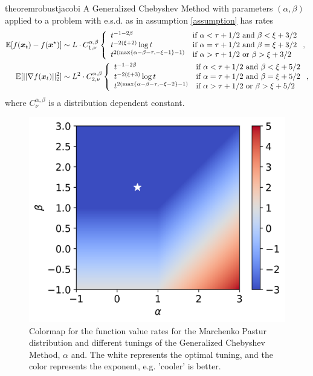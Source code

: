 \documentclass{article}
\begin{document}
\begin{restatable}{theorem}{robustjacobi}\label{thm: jacobirates}
A Generalized Chebyshev Method with parameters $(\alpha,\beta)$ applied to a problem with e.s.d. as in assumption \ref{assumption} has rates
\begin{align}
\mathbb{E}[f({\boldsymbol x}_t)-f({\boldsymbol x}^\star)]&\sim L\cdot C^{\alpha,\beta}_{1,\nu}
    \left\{\begin{array}{ll}
    t^{-1-2\beta} &\mbox{if } 
		  \alpha<\tau+1/2 \text{ and } \beta <\xi+3/2\\
		  t^{-2(\xi+2)}\log t& \mbox{if } 
		  \alpha=\tau+1/2 \text{ and } \beta =\xi+3/2\\
		  t^{2(\max\{\alpha-\beta-\tau,-\xi-1\}-1)}& \mbox{if } 
		  \alpha>\tau+1/2 \text{ or } \beta >\xi+3/2
	\end{array}\right. ,\\
	\mathbb{E}[||\nabla f({\boldsymbol x}_t)||^2_2]&\sim L^2\cdot C^{\alpha,\beta}_{2,\nu}
        \left\{\begin{array}{ll}
    t^{-1-2\beta} &\mbox{if } 
		  \alpha<\tau+1/2 \text{ and } \beta <\xi+5/2\\
		  t^{-2(\xi+3)}\log t& \mbox{if } 
		  \alpha=\tau+1/2 \text{ and } \beta =\xi+5/2\\
		  t^{2(\max\{\alpha-\beta-\tau,-\xi-2\}-1)}& \mbox{if } 
		  \alpha>\tau+1/2 \text{ or } \beta >\xi+5/2
	\end{array}\right. ,
\end{align}
where $C^{\alpha,\beta}_\nu$ is a distribution dependent constant.
\end{restatable}
\begin{figure}
    \centering
    \includegraphics[width=4 cm]{new_imgs/cmap.png}
    
    \caption{Colormap for the function value rates  for the Marchenko Pastur distribution and different tunings of the Generalized Chebyshev Method, $\alpha$ and. The white represents the optimal tuning, and the color represents the exponent, e.g. 'cooler' is better.}

\end{figure}
\end{document}
